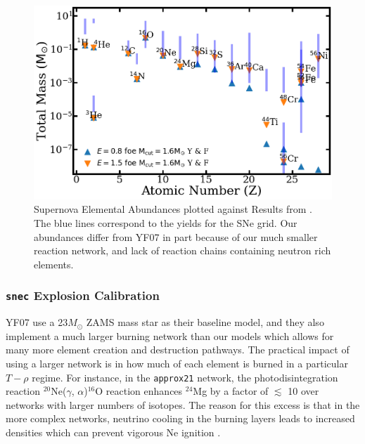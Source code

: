 \documentclass[twocolumn]{aastex631}
\begin{document}

\begin{figure}[hbt!]
    \centering
    \includegraphics[scale=0.25]{SNeabund.png}
    \caption{Supernova Elemental Abundances plotted against Results from \citet{YF07}. The blue lines correspond to the yields for the SNe grid. Our abundances differ from YF07 in part because of our much smaller reaction network, and lack of reaction chains containing neutron rich elements.}
    \label{fig:SNeabund}
\end{figure}

\subsubsection{\texttt{snec} Explosion Calibration}
YF07 use a 23$M_{\odot}$ ZAMS mass star as their baseline model, and they also implement a much larger burning network than our models which allows for many more element creation and destruction pathways. The practical impact of using a larger network is in how much of each element is burned in a particular $T-\rho$ regime. For instance, in the \texttt{approx21} network, the photodisintegration reaction $^{20}$Ne($\gamma$, $\alpha$)$^{16}$O reaction \citep{arnett74} enhances $^{24}$Mg by a factor of $\lesssim$ 10 over networks with larger numbers of isotopes. The reason for this excess is that in the more complex networks, neutrino cooling in the burning layers leads to increased densities which can prevent vigorous Ne ignition \citep{farmer16}. 
\end{document}
